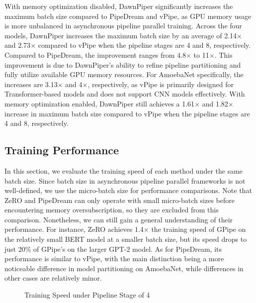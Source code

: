 With memory optimization disabled,
DawnPiper significantly increases the maximum batch size compared to PipeDream and vPipe,
as GPU memory usage is more unbalanced in asynchronous pipeline parallel training.
Across the four models,
DawnPiper increases the maximum batch size by an average of 2.14$\times$ and 2.73$\times$ compared to vPipe
when the pipeline stages are 4 and 8, respectively.
Compared to PipeDream, the improvement ranges from 4.8$\times$ to 11$\times$.
This improvement is due to DawnPiper’s ability to refine
pipeline partitioning and fully utilize available GPU memory resources.
For AmoebaNet specifically, the increases are 3.13$\times$ and 4$\times$, respectively,
as vPipe is primarily designed for Transformer-based models and does not support CNN models effectively.
With memory optimization enabled, DawnPiper still achieves a 1.61$\times$ and 1.82$\times$
increase in maximum batch size compared to vPipe when the pipeline stages are 4 and 8, respectively.

\subsection{Training Performance}
In this section, we evaluate the training speed of each method under the same batch size.
Since batch size in asynchronous pipeline parallel frameworks is not well-defined,
we use the micro-batch size for performance comparisons.
Note that ZeRO and PipeDream can only operate with small micro-batch sizes before encountering memory oversubscription,
so they are excluded from this comparison.
Nonetheless, we can still gain a general understanding of their performance.
For instance, ZeRO achieves 1.4$\times$ the training speed of GPipe
on the relatively small BERT model at a smaller batch size,
but its speed drops to just 20\% of GPipe's on the larger GPT-2 model.
As for PipeDream, its performance is similar to vPipe,
with the main distinction being a more noticeable difference in model partitioning on AmoebaNet,
while differences in other cases are relatively minor.
\begin{figure}[tb]
  \centering
  \caption{Training Speed under Pipeline Stage of 4}
  \label{fig:perf-4}
\end{figure}


